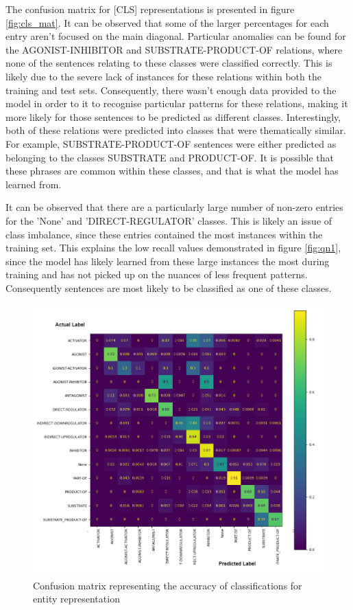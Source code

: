 \documentclass{l4proj}
\begin{document}
The confusion matrix for [CLS] representations is presented in figure \ref{fig:cls_mat}. It can be observed that some of the larger percentages for each entry aren't focused on the main diagonal. Particular anomalies can be found for the AGONIST-INHIBITOR and SUBSTRATE-PRODUCT-OF relations, where none of the sentences relating to these classes were classified correctly. This is likely due to the severe lack of instances for these relations within both the training and test sets. Consequently, there wasn't enough data provided to the model in order to it to recognise particular patterns for these relations, making it more likely for those sentences to be predicted as different classes. Interestingly, both of these relations were predicted into classes that were thematically similar. For example, SUBSTRATE-PRODUCT-OF sentences were either predicted as belonging to the classes SUBSTRATE and PRODUCT-OF. It is possible that these phrases are common within these classes, and that is what the model has learned from.

It can be observed that there are a particularly large number of non-zero entries for the 'None' and 'DIRECT-REGULATOR' classes. This is likely an issue of class imbalance, since these entries contained the most instances within the training set. This explains the low recall values demonstrated in figure \ref{fig:qn1}, since the model has likely learned from these large instances the most during training and has not picked up on the nuances of less frequent patterns. Consequently sentences are most likely to be classified as one of these classes.

\begin{figure}[htb]
    \centering
    \includegraphics[width=16cm]{images/ent_mult.png}
  \caption{Confusion matrix representing the accuracy of classifications for entity representation}
  \label{fig:ent_mat}
\end{figure}
\end{document}
